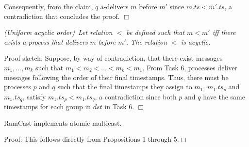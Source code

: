 Consequently, from the claim, $q$ a-delivers $m$ before $m'$ since $m.ts < m'.ts$, a contradiction that concludes the proof.
\hfill$\Box$

\vspace{2mm}
\begin{proposition}
\textit{(Uniform acyclic order)~Let relation $<$ be defined such that $m < m'$ iff there exists a process that delivers $m$ before $m'$.  The relation $<$ is acyclic.}
\end{proposition}
\noindent
{\sc Proof sketch:} 
Suppose, by way of contradiction, that there exist messages $m_1, ..., m_k$ such that $m_1 < m_2 < ... < m_k < m_1$. 
From Task 6, processes deliver messages following the order of their final timestamps.
Thus, there must be processes $p$ and $q$ such that the final timestamps they assign to $m_1$, $m_1.ts_p$ and  $m_1.ts_q$, satisfy $m_1.ts_p < m_1.ts_q$, a contradiction since both $p$ and $q$ have the same timestamps for each group in $dst$ in Task 6.
\hfill$\Box$

\vspace{2mm}
\begin{theorem}
RamCast implements atomic multicast.
\end{theorem}
\noindent
{\sc Proof:} 
This follows directly from Propositions 1 through 5.\hfill$\Box$

